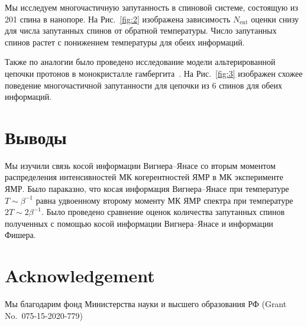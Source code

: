 \documentclass[preprint,12pt]{elsarticle}
\begin{document}
Мы исследуем многочастичную запутанность в спиновой системе, состоящую из 201 спина
в нанопоре. На Рис.~\ref{fig:2} изображена зависимость $N_\mathrm{ent}$ оценки снизу для числа запутанных спинов от обратной температуры. Число запутанных спинов растет с понижением температуры для обеих информаций. 

Также по аналогии было проведено исследование модели альтерированной цепочки протонов в монокристалле гамбергита~\cite{16,24}.
На Рис.~\ref{fig:3} изображен схожее поведение многочастичной запутанности для цепочки из 6 спинов для обеих информаций. 


\section{Выводы}
\label{sec:5}

Мы изучили связь косой информации Вигнера--Янасе со вторым моментом распределения интенсивностей МК когерентностей ЯМР в МК эксперименте ЯМР. 
Было параказно, что косая информация Вигнера--Янасе при температуре $T \sim \beta^{-1}$ равна 
удвоенному второму моменту МК ЯМР спектра при температуре $2T \sim 2\beta^{-1}$.
Было проведено сравнение оценок количества запутанных спинов полученных с помощью косой информации Вигнера--Янасе и информации Фишера.


\section{Acknowledgement}
\label{sec:6}
Мы благодарим фонд Министерства науки и высшего образования РФ (Grant No.~075-15-2020-779)






% 
% 


\end{document}
